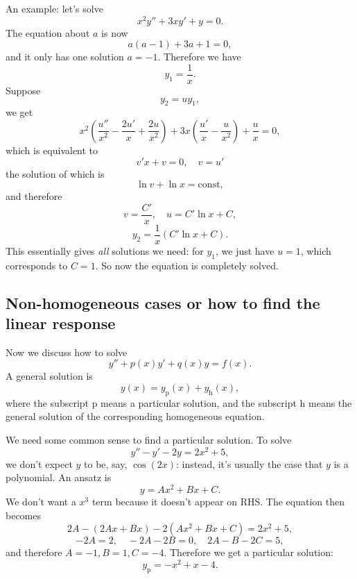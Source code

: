 \documentclass[hyperref, a4paper]{article}
\newcommand*{\const}{\mathrm{const}}
\begin{document}
An example: let's solve 
\begin{equation}
    x^2 y'' + 3x y' + y = 0.
\end{equation}
The equation about $a$ is now 
\[
    a(a-1) + 3a + 1 = 0,
\]
and it only has one solution $a = -1$.
Therefore we have 
\[
    y_1 = \frac{1}{x}.
\]
Suppose 
\[
    y_2 = u y_1,
\]
we get 
\[
    x^2 \left(
        \frac{u''}{x^2} - \frac{2 u'}{x} + \frac{2u}{x^2}
    \right)
    + 3 x \left(
        \frac{u'}{x} - \frac{u}{x^2}
    \right)
    + \frac{u}{x} = 0,
\]
which is equivalent to 
\[
    v' x + v = 0, \quad v = u'
\]
the solution of which is 
\[
    \ln v + \ln x = \const,
\]
and therefore 
\[
    v = \frac{C'}{x}, \quad 
    u = C' \ln x + C,
\]
\[
    y_2 = \frac{1}{x} (C' \ln x + C).
\]
This essentially gives \emph{all} solutions we need: 
for $y_1$, we just have $u = 1$,
which corresponds to $C = 1$.
So now the equation is completely solved.

\subsection{Non-homogeneous cases or how to find the linear response}

Now we discuss how to solve 
\begin{equation}
    y'' + p(x) y' + q(x) y = f(x).
    \label{eq:2nd-ode-nonhomogeneous}
\end{equation}
A general solution is 
\begin{equation}
    y(x) = y_{\text{p}}(x) + y_{\text{h}}(x),
\end{equation}
where the subscript p means a particular solution,
and the subscript h means the general solution of the corresponding homogeneous equation.

We need some common sense to find a particular solution.
To solve 
\begin{equation}
    y'' - y' - 2y = 2 x^2 + 5,
\end{equation}
we don't expect $y$ to be, say, $\cos(2x)$:
instead, it's usually the case that $y$ is a polynomial.
An ansatz is 
\[
    y = A x^2 + Bx + C.
\]
We don't want a $x^3$ term because it doesn't appear on RHS.
The equation then becomes 
\[
    2 A - (2 A x + B x) - 2 (A x^2 + Bx + C) = 2 x^2 + 5, 
\]
\[
    -2 A = 2, \quad - 2A - 2 B = 0, \quad 2 A - B - 2 C = 5,
\]
and therefore $A = -1, B = 1, C = - 4$.
Therefore we get a particular solution: 
\begin{equation}
    y_{\text{p}} = - x^2 + x - 4.
\end{equation}
\end{document}
